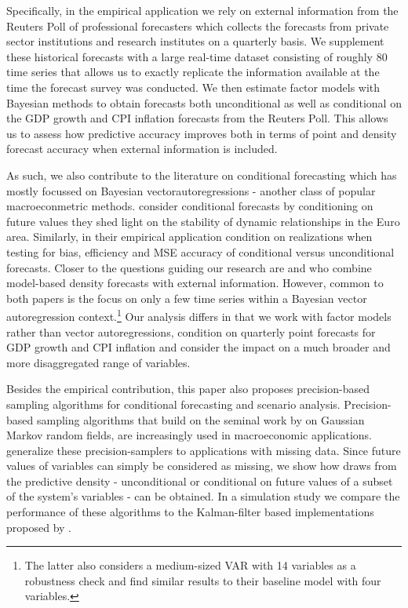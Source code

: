 \documentclass[notitlepage,a4paper,12pt]{article}
\begin{document}
Specifically, in the empirical application we rely on external information from the Reuters Poll of professional forecasters which collects the forecasts from private sector institutions and research institutes on a quarterly basis. We supplement these historical forecasts with a large real-time dataset consisting of roughly 80 time series that allows us to exactly replicate the information available at the time the forecast survey was conducted. We then estimate factor models with Bayesian methods to obtain forecasts both unconditional as well as conditional on the GDP growth and CPI inflation forecasts from the Reuters Poll. This allows us to assess how predictive accuracy improves both in terms of point and density forecast accuracy when external information is included.

As such, we also contribute to the literature on conditional forecasting which has mostly focussed on Bayesian vectorautoregressions - another class of popular macroeconmetric methods. \citet{bgl_2015ijf} consider conditional forecasts by conditioning on future values they shed light on the stability of dynamic relationships in the Euro area. Similarly, in their empirical application \citet{clarkmccracken_2017_jae} condition on realizations when testing for bias, efficiency and MSE accuracy of conditional versus unconditional forecasts. Closer to the questions guiding our research are \citet{kruegerclarkravazzolo2017_jbes} and \citet{ganicsodendahl_2021_ijf} who combine model-based density forecasts with external information. However, common to both papers is the focus on only a few time series within a Bayesian vector autoregression context.\footnote{The latter also considers a medium-sized VAR with 14 variables as a robustness check and find similar results to their baseline model with four variables.} Our analysis differs in that we work with factor models rather than vector autoregressions, condition on quarterly point forecasts for GDP growth and CPI inflation and consider the impact on a much broader and more disaggregated range of variables.

Besides the empirical contribution, this paper also proposes precision-based sampling algorithms for conditional forecasting and scenario analysis. Precision-based sampling algorithms \citep{chanjeliazkov_2009,mccausland2012_jecmtr} that build on the seminal work by \citet{rue2001_jrss} on Gaussian Markov random fields, are increasingly used in macroeconomic applications. \citet{HauberSchumacher2021} generalize these precision-samplers to applications with missing data. Since future values of variables can simply be considered as missing, we show how draws from the predictive density - unconditional or conditional on future values of a subset of the system's variables - can be obtained. In a simulation study we compare the performance of these algorithms to the Kalman-filter based implementations proposed by \citet{bgl_2015ijf}.
\end{document}

